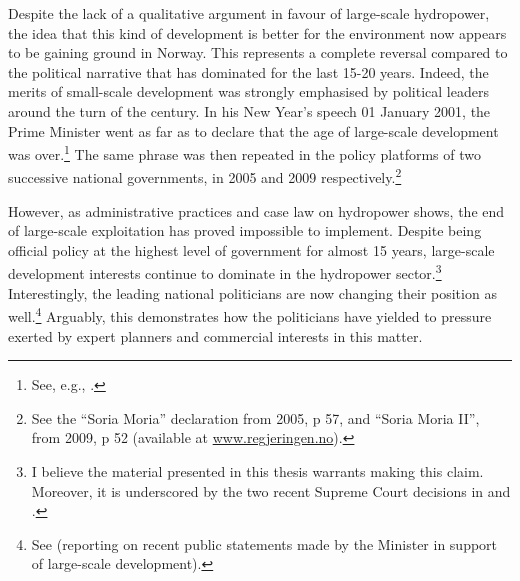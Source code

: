 Despite the lack of a qualitative argument in favour of large-scale hydropower, the idea that this kind of development is better for the environment now appears to be gaining ground in Norway. This represents a complete reversal compared to the political narrative that has dominated for the last 15-20 years. Indeed, the merits of small-scale development was strongly emphasised by political leaders around the turn of the century. In his New Year's speech 01 January 2001, the Prime Minister went as far as to declare that the age of large-scale development was over.\footnote{See, e.g., \cite[34]{haltbrekken12}.} The same phrase was then repeated in the policy platforms of two successive national governments, in 2005 and 2009 respectively.\footnote{See the ``Soria Moria'' declaration from 2005, p 57, and ``Soria Moria II'', from 2009, p 52 (available at \url{www.regjeringen.no}).} 

However, as administrative practices and case law on hydropower shows, the end of large-scale exploitation has proved impossible to implement. Despite being official policy at the highest level of government for almost 15 years, large-scale development interests continue to dominate in the hydropower sector.\footnote{I believe the material presented in this thesis warrants making this claim. Moreover, it is underscored by the two recent Supreme Court decisions in \cite{jorpeland11} and \cite{otra13}.} Interestingly, the leading national politicians are now changing their position as well.\footnote{See \cite{liemin14} (reporting on recent public statements made by the Minister in support of large-scale development).} Arguably, this demonstrates how the politicians have yielded to pressure exerted by expert planners and commercial interests in this matter.


